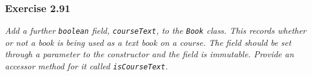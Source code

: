 \subsubsection*{Exercise 2.91}
\textit{Add a further \lstinline{boolean} field, \lstinline{courseText}, to 
the \lstinline{Book} class. This records whether or not a book is being used 
as a text book on a course. The field should be set through a parameter to the 
constructor and the field is immutable. Provide an accessor method for it 
called \lstinline{isCourseText}. }\\

